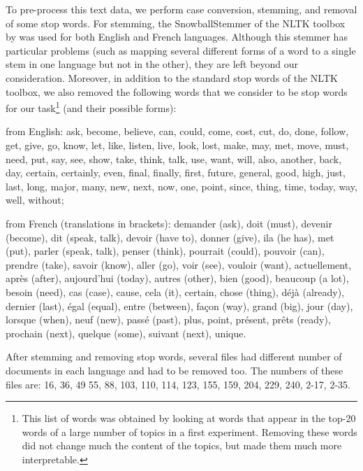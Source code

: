 \documentclass{article}
\newenvironment{mi}{%
  \begin{list}{-}{}
  \let\olditem\item
}{%
  \end{list}
}
\begin{document}
%
%

To pre-process this text data, we perform case conversion, stemming, and removal of some stop words. For stemming, the SnowballStemmer of the NLTK toolbox by  was used for both English and French languages. Although this stemmer has particular problems (such as mapping several different forms of a word to a single stem in one language but not in the other), they are left beyond our consideration. Moreover, in addition to the standard stop words of the NLTK toolbox, we also removed the following words that we consider to be stop words for our task\footnote{This list of words was obtained by looking at words that appear in the top-20 words of a large number of topics in a first experiment. Removing these words did not change much the content of the topics, but made them much more interpretable.} (and their possible forms):
\begin{mi}
\item from English: ask, become, believe, can, could, come, cost, cut, do, done, follow, get, give, go, know, let, like, listen, live, look, lost, make, may, met, move, must, need, put, say, see, show, take, think, talk, use, want, will, also, another, back, day, certain, certainly, even, final, finally, first, future, general, good, high, just, last, long, major, many, new, next, now, one, point, since, thing, time, today, way, well, without;
\item from French (translations in brackets): demander (ask), doit (must), devenir (become), dit (speak, talk), devoir (have to), donner (give), ila (he has), met (put), parler (speak, talk), penser (think), pourrait (could), pouvoir (can), prendre (take), savoir (know), aller (go), voir (see), vouloir (want), actuellement, apr\`es (after), aujourd'hui (today), autres (other), bien (good), beaucoup (a lot), besoin (need), cas (case), cause, {c}ela (it), certain, chose (thing), d\'ej\`a (already), dernier (last), \'egal (equal), entre (between), fa{\c{c}}on (way), grand (big), jour (day), lorsque (when), neuf (new), pass\'e (past), plus, point, pr\'esent, pr\^ets (ready), prochain (next), quelque (some), suivant (next), unique.
\end{mi}



After stemming and removing stop words, several files had different number of documents in each language and had to be removed too. The numbers of these files are: 16, 36, 49 55, 88, 103, 110, 114, 123, 155, 159, 204, 229, 240, 2-17, 2-35. 
\end{document}
